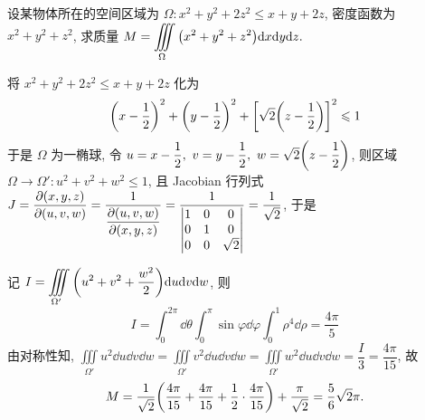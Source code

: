 \begin{example}
    设某物体所在的空间区域为 $\Omega:x^2+y^2+2z^2\leqslant x+y+2z$, 密度函数为 $x^2+y^2+z^2$, 求质量 $\displaystyle M=\iiint\limits_\Omega\qty(x^2+y^2+z^2)\dd x\dd y\dd z.$
\end{example}
\begin{solution}
    将 $x^2+y^2+2z^2\leqslant x+y+2z$ 化为 $$\qty(x-\dfrac{1}{2})^2+\qty(y-\dfrac{1}{2})^2+\qty[\sqrt{2}\qty(z-\dfrac{1}{2})]^2\leqslant 1$$
    于是 $\Omega$ 为一椭球, 令 $u=x-\dfrac{1}{2},~v=y-\dfrac{1}{2},~w=\sqrt{2}\qty(z-\dfrac{1}{2})$, 则区域 $\Omega\to\Omega':u^2+v^2+w^2\leqslant 1$,
    且 Jacobian 行列式 $\displaystyle J=\pdv{(x,y,z)}{(u,v,w)}=\dfrac{1}{\displaystyle \pdv{(u,v,w)}{(x,y,z)}}=\dfrac{1}{\begin{vmatrix}
                1 & 0 & 0        \\
                0 & 1 & 0        \\
                0 & 0 & \sqrt{2}
            \end{vmatrix}}=\dfrac{1}{\sqrt{2}}$, 于是
    记 $\displaystyle I=\iiint\limits_{\Omega'}\qty(u^2+v^2+\dfrac{w^2}{2})\dd u\dd v\dd w$, 则
    $$I=\int_{0}^{2\pi}\dd \theta\int_{0}^{\pi}\sin\varphi\dd \varphi\int_{0}^{1}\rho^4\dd \rho=\dfrac{4\pi}{5}$$
    由对称性知, $\displaystyle\iiint\limits_{\Omega'}u^2\dd u\dd v\dd w=\iiint\limits_{\Omega'}v^2\dd u\dd v\dd w=\iiint\limits_{\Omega'}w^2\dd u\dd v\dd w=\dfrac{I}{3}=\dfrac{4\pi}{15}$,
    故 $$M=\dfrac{1}{\sqrt{2}}\qty(\dfrac{4\pi}{15}+\dfrac{4\pi}{15}+\dfrac{1}{2}\cdot\dfrac{4\pi}{15})+\dfrac{\pi}{\sqrt{2}}=\dfrac{5}{6}\sqrt{2}\pi.$$
\end{solution}

